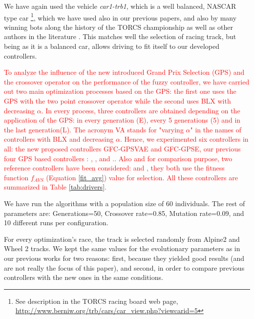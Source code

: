 \documentclass[10pt,journal,compsoc]{IEEEtran}
\begin{document}
We have again used the vehicle \mbox{\textit{car1-trb1}},
which is a well balanced, NASCAR type car \footnote{See description in
  the TORCS racing board web page,
  \url{http://www.berniw.org/trb/cars/car_view.php?viewcarid=5}},
which we have used also in our previous papers, and also by many
winning bots along the history of the TORCS championship
\cite{torcs5} as well as other authors in the literature
\cite{auteur2010}. This matches well the selection
of racing track, but being as it is a balanced car, allows driving to
fit itself to our developed controllers.


\textcolor{red}{
To analyze the influence of the new introduced Grand Prix Selection
(GPS) and the crossover operator on the performance of the fuzzy
controller, we have carried out two main optimization processes based
on the GPS: the first one uses the GPS with the two point crossover
operator while the second uses  BLX with decreasing $\alpha$.
In every process, three controllers are obtained depending on the application of the GPS: in every generation (E), every 5 generations (5) and in the last generation(L). The acronym VA  stands for "varying $\alpha$" in the names of  controllers with BLX and decreasing $\alpha$.
Hence, we experimented six controllers in all: the new
proposed controllers {\sf GFC-GPSVAE} and {\sf GFC-GPSE}, our previous four GPS based controllers \cite{DBLP:conf/cig/SalemMG19}: {}, {},{} and {}..
Also and for comparison purpose, two reference controllers have been considered: {}\cite{DBLP:conf/cig/SalemMG19} and {}\cite{salem_cig2018}, they both use the fitness function $f_{AVS}$ (Equation \ref{fit_avg}) value for selection.
All these controllers are summarized in Table \ref{tab:drivers}. 
}

We have run the algorithms with a population size of 60
individuals. The rest of parameters are: Generations=50, Crossover
rate=0.85, Mutation rate=0.09, and 10 different runs per
configuration. %
              
For every optimization's race, the track is selected randomly from Alpine2 and Wheel 2 tracks.
We kept the same values for the evolutionary parameters as in our previous works for two reasons: first, because they yielded good results (and are not really the focus of this paper), and second, in order to compare previous controllers with the new ones in the same conditions.
\end{document}
